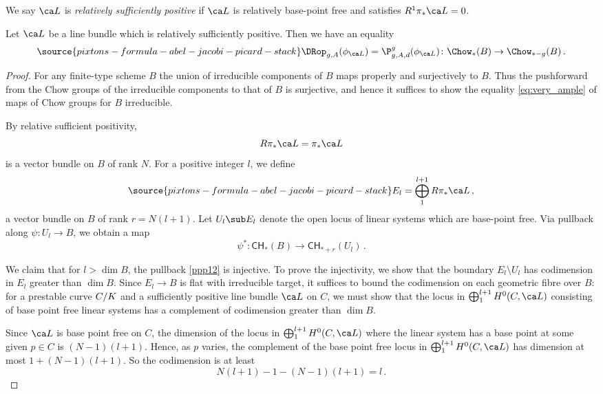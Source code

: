 We say $\ca L$ is \emph{relatively sufficiently positive} if $\ca L$ is relatively base-point free  and satisfies $R^1\pi_*\ca L = 0$.


\begin{lemma}
\notready\label{sec:very_ample}
Let $\ca L$ be a line bundle which is relatively sufficiently positive.
Then we have an equality
\begin{equation}\label{eq:very_ample}
\source{pixtons-formula-abel-jacobi-picard-stack}
\DRop_{g,A}(\phi_{\ca L})=
\P_{g,A,d}^g(\phi_{\ca L})  \colon \Chow_*(B) \to \Chow_{*-g}(B)\, .
\end{equation}

\end{lemma}
\begin{proof}

For any finite-type scheme $B$ the union of irreducible components of $B$ maps properly and surjectively to $B$. Thus the pushforward from the Chow groups of the irreducible components to that of $B$ is surjective, and hence it suffices to show the equality \eqref{eq:very_ample} of maps of Chow groups for $B$ irreducible.

By relative sufficient positivity,
$$R\pi_*\ca L = \pi_*\ca L$$
is a vector bundle on $B$ of rank $N$.
For a positive integer $l$, we define
\begin{equation}\label{ppp12}
\source{pixtons-formula-abel-jacobi-picard-stack}
E_l =\bigoplus_1^{l+1} R\pi_*\ca L \, ,
\end{equation}
a vector bundle on $B$ of rank $r=N(l+1)$.
Let $U_l \sub E_l$ denote the open locus of linear systems which are base-point free. Via pullback along $\psi\colon U_l \to B$, we obtain
 a map $$\psi^*\colon \mathsf{CH}_*(B) \to \mathsf{CH}_{*+r}(U_l)\, .$$


We claim that for $l>\dim B$, the pullback \eqref{ppp12}
is injective.
To prove the injectivity, we show that the boundary $E_l \setminus U_l$ has codimension in $E_l$ greater than $\dim B$. Since $E_l \to B$ is flat with irreducible target, it suffices to bound the codimension  on each geometric fibre over $B$: for a  prestable curve $C/{K}$ and a sufficiently
positive line bundle $\ca L$ on $C$, we must show that the locus in $\bigoplus_1^{l+1} H^0(C, \ca L)$ consisting of base point free linear systems has
a complement of codimension
greater than $\dim B$.

Since $\ca L$ is base point free on $C$, the dimension of the locus in
$\bigoplus_1^{l+1} H^0(C, \ca L)$ where the linear system has
a base point at some given $p\in C$ is $(N-1)(l+1)$. Hence, as $p$ varies, the complement of the
base point free locus in $\bigoplus_1^ {l+1} H^0(C, \ca L)$ has dimension at
most $1 + (N-1)(l+1)$. So the codimension is at least
$$ N(l+1) - 1 - (N-1)(l+1)  = l \, .$$



\end{proof}
